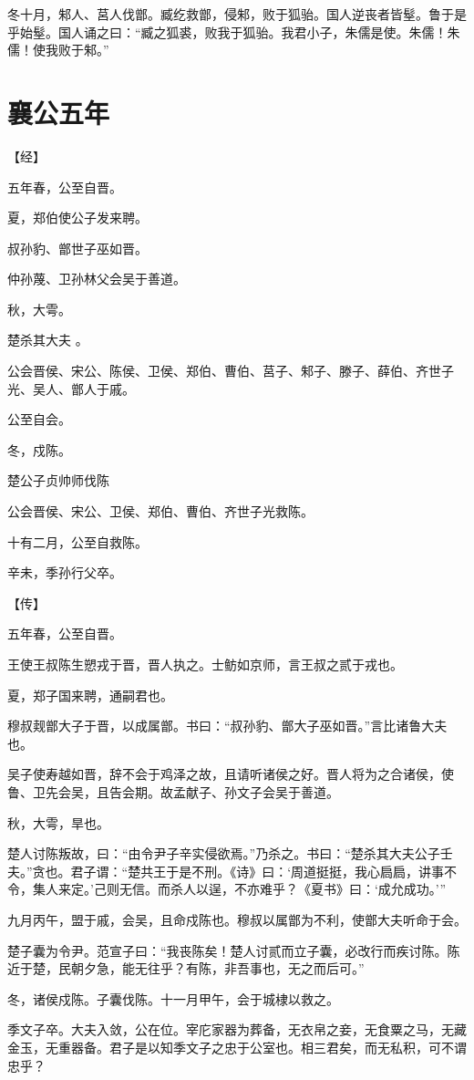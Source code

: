 \documentclass[a4paper,12pt,UTF8,twoside]{ctexbook}
\begin{document}
冬十月，邾人、莒人伐鄫。臧纥救鄫，侵邾，败于狐骀。国人逆丧者皆髽。鲁于是乎始髽。国人诵之曰：“臧之狐裘，败我于狐骀。我君小子，朱儒是使。朱儒！朱儒！使我败于邾。”


\chapter{襄公五年}


【经】

五年春，公至自晋。

夏，郑伯使公子发来聘。

叔孙豹、鄫世子巫如晋。

仲孙蔑、卫孙林父会吴于善道。

秋，大雩。

楚杀其大夫 。

公会晋侯、宋公、陈侯、卫侯、郑伯、曹伯、莒子、邾子、滕子、薛伯、齐世子光、吴人、鄫人于戚。

公至自会。

冬，戍陈。

楚公子贞帅师伐陈

公会晋侯、宋公、卫侯、郑伯、曹伯、齐世子光救陈。

十有二月，公至自救陈。

辛未，季孙行父卒。

【传】

五年春，公至自晋。

王使王叔陈生愬戎于晋，晋人执之。士鲂如京师，言王叔之贰于戎也。

夏，郑子国来聘，通嗣君也。

穆叔觌鄫大子于晋，以成属鄫。书曰：“叔孙豹、鄫大子巫如晋。”言比诸鲁大夫也。

吴子使寿越如晋，辞不会于鸡泽之故，且请听诸侯之好。晋人将为之合诸侯，使鲁、卫先会吴，且告会期。故孟献子、孙文子会吴于善道。

秋，大雩，旱也。

楚人讨陈叛故，曰：“由令尹子辛实侵欲焉。”乃杀之。书曰：“楚杀其大夫公子壬夫。”贪也。君子谓：“楚共王于是不刑。《诗》曰：‘周道挺挺，我心扃扃，讲事不令，集人来定。’己则无信。而杀人以逞，不亦难乎？《夏书》曰：‘成允成功。’”

九月丙午，盟于戚，会吴，且命戍陈也。穆叔以属鄫为不利，使鄫大夫听命于会。

楚子囊为令尹。范宣子曰：“我丧陈矣！楚人讨贰而立子囊，必改行而疾讨陈。陈近于楚，民朝夕急，能无往乎？有陈，非吾事也，无之而后可。”

冬，诸侯戍陈。子囊伐陈。十一月甲午，会于城棣以救之。

季文子卒。大夫入敛，公在位。宰庀家器为葬备，无衣帛之妾，无食粟之马，无藏金玉，无重器备。君子是以知季文子之忠于公室也。相三君矣，而无私积，可不谓忠乎？
\end{document}
